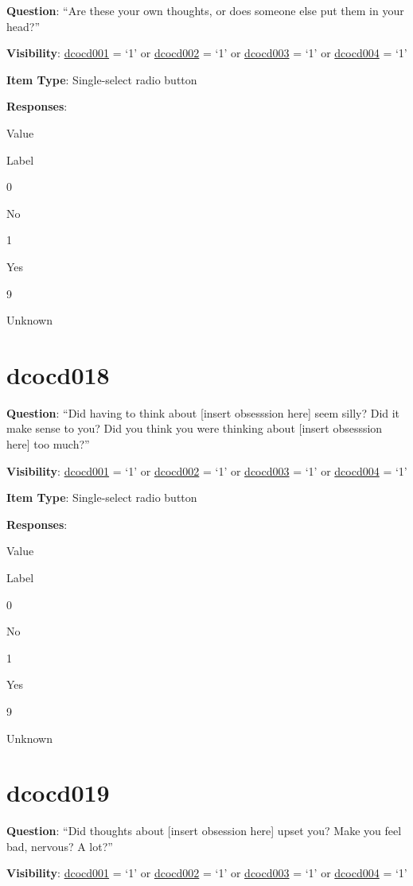 \documentclass[]{book}
\begin{document}
\textbf{Question}: ``Are these your own thoughts, or does someone else put them in your head?''

\textbf{Visibility}: \protect\hyperlink{dcocd001}{dcocd001} = `1' or \protect\hyperlink{dcocd002}{dcocd002} = `1' or \protect\hyperlink{dcocd003}{dcocd003} = `1' or \protect\hyperlink{dcocd004}{dcocd004} = `1'

\textbf{Item Type}: Single-select radio button

\textbf{Responses}:

Value

Label

0

No

1

Yes

9

Unknown

\hypertarget{dcocd018}{%
\section{dcocd018}\label{dcocd018}}

\textbf{Question}: ``Did having to think about {[}insert obsesssion here{]} seem silly? Did it make sense to you? Did you think you were thinking about {[}insert obsesssion here{]} too much?''

\textbf{Visibility}: \protect\hyperlink{dcocd001}{dcocd001} = `1' or \protect\hyperlink{dcocd002}{dcocd002} = `1' or \protect\hyperlink{dcocd003}{dcocd003} = `1' or \protect\hyperlink{dcocd004}{dcocd004} = `1'

\textbf{Item Type}: Single-select radio button

\textbf{Responses}:

Value

Label

0

No

1

Yes

9

Unknown

\hypertarget{dcocd019}{%
\section{dcocd019}\label{dcocd019}}

\textbf{Question}: ``Did thoughts about {[}insert obsession here{]} upset you? Make you feel bad, nervous? A lot?''

\textbf{Visibility}: \protect\hyperlink{dcocd001}{dcocd001} = `1' or \protect\hyperlink{dcocd002}{dcocd002} = `1' or \protect\hyperlink{dcocd003}{dcocd003} = `1' or \protect\hyperlink{dcocd004}{dcocd004} = `1'
\end{document}
